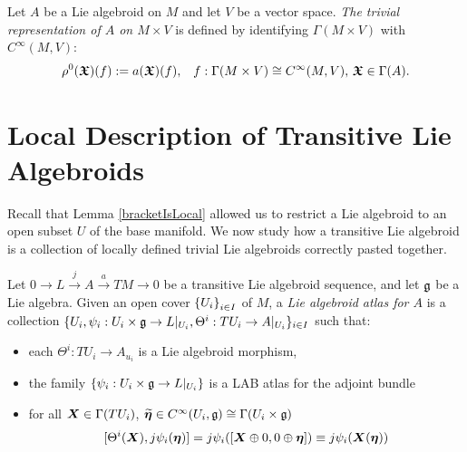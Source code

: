 \begin{definition}
Let $A$ be a Lie algebroid on $M$ and let $V$ be a vector space. \emph{The trivial representation of $A$ on $M \times V$} is defined by identifying $\Gamma(M \times V)$ with $C^\infty(M, V)$:
\begin{align*}
    \rho^0(\bm{\mathfrak{X}})(f) := a(\bm{\mathfrak{X}})(f), && f: \Gamma(M \times V) \cong C^\infty(M, V),\, \bm{\mathfrak{X}} \in \Gamma(A).
\end{align*}
\end{definition}

\section{Local Description of Transitive Lie Algebroids}

Recall that Lemma \ref{bracketIsLocal} allowed us to restrict a Lie algebroid to an open subset $U$ of the base manifold. We now study how a transitive Lie algebroid is a collection of locally defined trivial Lie algebroids correctly pasted together.

\begin{definition}
Let $0 \to L \xrightarrow{j} A \xrightarrow{a} TM \to 0$ be a transitive Lie algebroid sequence, and let $\mathfrak{g}$ be a Lie algebra. Given an open cover $\left\{ U_i \right\}_{i \in I}$ of $M$, a \emph{Lie algebroid atlas for $A$} is a collection $\{U_i, \psi_i:U_i \times \mathfrak{g} \to L|_{U_i}, \Theta^i: TU_i \to A|_{U_i}\}_{i \in I}$ such that:
    \begin{itemize}
    
    \item each $\Theta^i: TU_i \to A_{u_i}$ is a Lie algebroid morphism,
    
    \item the family $\left\{ \psi_i:U_i \times \mathfrak{g} \to L|_{U_i} \right\}$ is a LAB atlas for the adjoint bundle 
    
    \item for all $\bm{X} \in \Gamma(TU_i)$, $\widetilde{\bm{\eta}} \in C^\infty(U_i, \mathfrak{g}) \cong \Gamma(U_i \times \mathfrak{g})$
        \begin{align} \label{eqnCompLocal}
            [\Theta^i(\bm{X}), j\psi_i(\bm{\eta})] = j\psi_i([\bm{X} \oplus 0, 0 \oplus \bm{\eta}]) \equiv j\psi_i(\bm{X}(\bm{\eta})) 
        \end{align}
    
    \end{itemize}
\end{definition}


